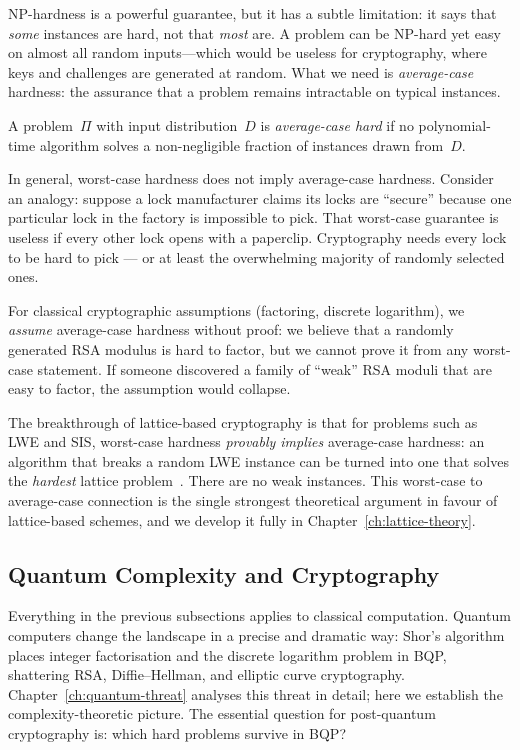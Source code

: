 NP-hardness is a powerful guarantee, but it has a subtle limitation: it says that \emph{some} instances are hard, not that \emph{most} are.  A problem can be NP-hard yet easy on almost all random inputs---which would be useless for cryptography, where keys and challenges are generated at random.  What we need is \emph{average-case} hardness: the assurance that a problem remains intractable on typical instances.

\begin{definition}
\label{def:avg-case}
A problem~$\Pi$ with input distribution~$D$ is \emph{average-case hard} if no polynomial-time algorithm solves a non-negligible fraction of instances drawn from~$D$.
\end{definition}

In general, worst-case hardness does not imply average-case hardness.  Consider an analogy: suppose a lock manufacturer claims its locks are ``secure'' because one particular lock in the factory is impossible to pick.  That worst-case guarantee is useless if every other lock opens with a paperclip.  Cryptography needs every lock to be hard to pick --- or at least the overwhelming majority of randomly selected ones.

For classical cryptographic assumptions (factoring, discrete logarithm), we \emph{assume} average-case hardness without proof: we believe that a randomly generated RSA modulus is hard to factor, but we cannot prove it from any worst-case statement.  If someone discovered a family of ``weak'' RSA moduli that are easy to factor, the assumption would collapse.

The breakthrough of lattice-based cryptography is that for problems such as LWE and SIS, worst-case hardness \emph{provably implies} average-case hardness: an algorithm that breaks a random LWE instance can be turned into one that solves the \emph{hardest} lattice problem~\cite{Ajtai1996, Regev2009}.  There are no weak instances.  This worst-case to average-case connection is the single strongest theoretical argument in favour of lattice-based schemes, and we develop it fully in Chapter~\ref{ch:lattice-theory}.


\subsection{Quantum Complexity and Cryptography}
\label{subsec:quantum-complexity}

Everything in the previous subsections applies to classical computation.  Quantum computers change the landscape in a precise and dramatic way: Shor's algorithm~\cite{Shor1997} places integer factorisation and the discrete logarithm problem in BQP, shattering RSA, Diffie--Hellman, and elliptic curve cryptography.  Chapter~\ref{ch:quantum-threat} analyses this threat in detail; here we establish the complexity-theoretic picture.  The essential question for post-quantum cryptography is: which hard problems survive in BQP?


